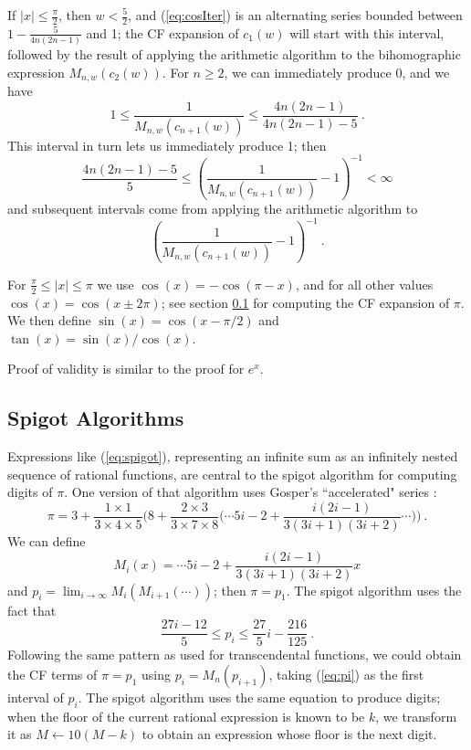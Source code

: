 \documentclass[11pt, oneside]{amsart}   	%
\renewcommand{\:}{\negthickspace:\negthickspace}
\begin{document}
If $|x| \leq \frac{\pi}{2}$, then $w < \frac{5}{2}$, and (\ref{eq:cosIter}) is an alternating series bounded between $1 - \frac{5}{4n(2n-1)}$ and 1; the CF expansion of $c_1(w)$ will start with this interval,  followed by the result of applying the arithmetic algorithm to the bihomographic expression $M_{n,w}(c_2(w))$. For $n \geq 2$, we can immediately produce 0, and we have
\[
1  \leq \frac{1}{M_{n,w}(c_{n+1}(w))} \leq \frac{4n(2n-1)}{4n(2n-1)-5} \ .
\]
This interval in turn lets us immediately produce 1; then
\[
 \frac{4n(2n-1)-5}{5} \leq \left(\frac{1}{M_{n,w}(c_{n+1}(w))} - 1 \right)^{-1} < \infty
\]
and subsequent intervals come from applying the arithmetic algorithm to
\[
\left(\frac{1}{M_{n,w}(c_{n+1}(w))} - 1\right) ^{-1} \ .
\]

For $\frac{\pi}{2} \leq |x| \leq \pi$ we use $\cos(x) = -\cos(\pi - x)$, and for all other values $\cos(x) = \cos(x \pm 2\pi)$; see section \ref{sec:spigot} for computing the CF expansion of $\pi$. We then define $\sin(x) = \cos(x-\pi/2)$ and $\tan(x)=\sin(x)/\cos(x)$.

Proof of validity is similar to the proof for $e^x$.

\subsection{Spigot Algorithms}\label{sec:spigot}
Expressions like (\ref{eq:spigot}), representing an infinite sum as an infinitely nested sequence of rational functions, are central to the spigot algorithm\cite{Gibbons2016,Rabinowitz2016} for computing digits of $\pi$. One version of that algorithm uses Gosper's ``accelerated" series \cite{acceleration}:
\[
\pi = 3 + \frac{1 \times 1}{3 \times 4 \times 5}\big(8 + \frac{2 \times 3}{3 \times 7 \times 8}\big( \cdots 5i-2 + \frac{i(2i-1)}{3(3i+1)(3i+2)} \cdots \big) \big) \ .
\]
We can define
\[
M_i(x) = \cdots 5i-2 + \frac{i(2i-1)}{3(3i+1)(3i+2)}x
\]
and $p_i = \lim_{i \to \infty} M_i(M_{i+1}(\cdots))$;
then $\pi = p_1$. The spigot algorithm uses the fact that
\begin{equation}\label{eq:pi}
\frac{27i-12}{5} \leq p_i \leq \frac{27}{5}i - \frac{216}{125} \ .
\end{equation}
Following the same pattern as used for transcendental functions, we could obtain the CF terms of $\pi = p_1$ using $p_i = M_n(p_{i+1})$, taking (\ref{eq:pi}) as the first interval of $p_i$. The spigot algorithm uses the same equation to produce digits; when the floor of the current rational expression is known to be $k$, we transform it as $M \leftarrow 10(M-k)$ to obtain an expression whose floor is the next digit.
\end{document}
